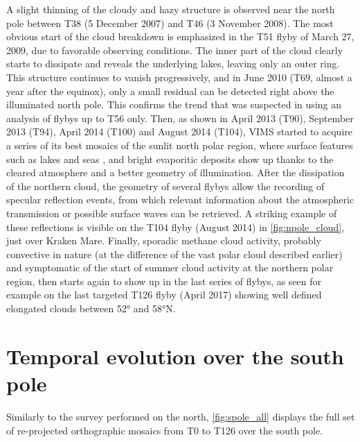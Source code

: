 \documentclass[preprint,twocolumn,5p,authoryear,compress,colorlinks=true]{elsarticle}
\newcommand{\figref}[1]{\autoref{fig:#1}}
\begin{document}
A slight thinning of the cloudy and hazy structure is observed near the north pole between T38 (5 December 2007) and T46 (3 November 2008). The most obvious start of the cloud breakdown is emphasized in the T51 flyby of March 27, 2009, due to favorable observing conditions. The inner part of the cloud clearly starts to dissipate and reveals the underlying lakes, leaving only an outer ring. This structure continues to vanish progressively, and in June 2010 (T69, almost a year after the equinox), only a small residual can be detected right above the illuminated north pole. This confirms the trend that was suspected in \cite{LeMouelic2012} using an analysis of flybys up to T56 only.
Then, as shown in April 2013 (T90), September 2013 (T94), April 2014 (T100) and August 2014 (T104), VIMS started to acquire a series of its best mosaics of the sunlit north polar region, where surface features such as lakes and seas \citep{Sotin2012}, and bright evaporitic deposits \citep{MacKenzie2014} show up thanks to the cleared atmosphere and a better geometry of illumination. After the dissipation of the northern cloud, the geometry of several flybys allow the recording of specular reflection events, from which relevant information about the atmospheric transmission \citep{Barnes2013} or possible surface waves \citep{Barnes2014} can be retrieved.
A striking example of these reflections is visible on the T104 flyby (August 2014) in \figref{npole_cloud}, just over Kraken Mare. Finally, sporadic methane cloud activity, probably convective in nature (at the difference of the vast polar cloud described earlier) and symptomatic of the start of summer cloud activity at the northern polar region, then starts again to show up in the last series of flybys, as seen for example on the last targeted T126 flyby (April 2017) showing well defined elongated clouds between \ang{52} and \ang{58}N.


\section{Temporal evolution over the south pole}
Similarly to the survey performed on the north, \figref{spole_all} displays the full set of re-projected orthographic mosaics from T0 to T126 over the south pole.
\end{document}
